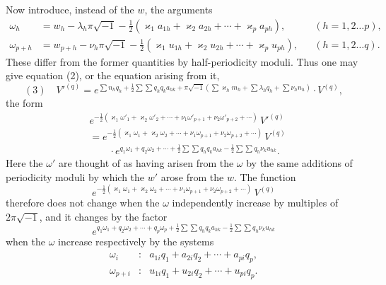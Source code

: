\documentclass[10pt]{article}
\begin{document}
Now introduce, instead of the \(w\), the arguments
\[
\begin{aligned}
\omega_h&=w_h-\lambda_h\pi\sqrt{-1}-\frac12(\varkappa_1a_{1h}+\varkappa_2a_{2h}+\cdots+\varkappa_pa_{ph}),
&& (h=1,2\ldots p),\\
\omega_{p+h}&=w_{p+h}-\nu_h\pi\sqrt{-1}-\frac12(\varkappa_1u_{1h}+\varkappa_2u_{2h}+\cdots+\varkappa_pu_{ph}),
&& (h=1,2\ldots q).
\end{aligned}
\]
These differ from the former quantities by half-periodicity moduli. Thus one may give equation (2), or the equation arising from it,
\[
(3)\quad
V'^{(q)}=
 e^{\sum n_hq_h+\frac12\sum\sum q_hq_ka_{hk}+
 \pi\sqrt{-1}(\sum\varkappa_hm_h+\sum\lambda_hq_h+\sum\nu_hn_h)}\cdot V^{(q)},
\]
the form
\[
\begin{aligned}
&e^{-\frac12(\varkappa_1\omega'_1+\varkappa_2\omega'_2+\cdots+\nu_1\omega'_{p+1}+\nu_2\omega'_{p+2}+\cdots)}\,V'^{(q)}\\
&=e^{-\frac12(\varkappa_1\omega_1+\varkappa_2\omega_2+\cdots+\nu_1\omega_{p+1}+\nu_2\omega_{p+2}+\cdots)}\,V^{(q)}\\
&\qquad\cdot e^{q_1\omega_1+q_2\omega_2+\cdots+\frac12\sum\sum q_hq_ka_{hk}-\frac12\sum\sum q_h\nu_ku_{hk}}.
\end{aligned}
\]
Here the \(\omega'\) are thought of as having arisen from the \(\omega\) by the same additions of periodicity moduli by which the \(w'\) arose from the \(w\). The function
\[
e^{-\frac12(\varkappa_1\omega_1+\varkappa_2\omega_2+\cdots+\nu_1\omega_{p+1}+\nu_2\omega_{p+2}+\cdots)}\,V^{(q)}
\]
therefore does not change when the \(\omega\) independently increase by multiples of \(2\pi\sqrt{-1}\), and it changes by the factor
\[
e^{q_1\omega_1+q_2\omega_2+\cdots+q_p\omega_p+\frac12\sum\sum q_hq_ka_{hk}-\frac12\sum\sum q_h\nu_ku_{hk}}
\]
when the \(\omega\) increase respectively by the systems
\[
\begin{array}{rcl}
\omega_i&:&a_{1i}q_1+a_{2i}q_2+\cdots+a_{pi}q_p,\\
\omega_{p+i}&:&u_{1i}q_1+u_{2i}q_2+\cdots+u_{pi}q_p.
\end{array}
\]
\end{document}
